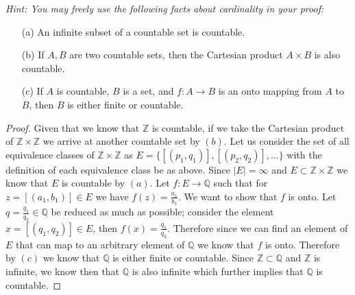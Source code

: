 \documentclass[11pt]{article}
\theoremstyle{definition}
\newcommand{\Z}{\mathbb{Z}}
\newcommand{\Q}{\mathbb{Q}}
\begin{document}
{\it Hint: You may freely use the following facts about cardinality in your proof: 
\begin{itemize}
	\item[(a)] An infinite subset of a countable set is countable.
	\item[(b)] If $A, B$ are two countable sets, then the Cartesian product $A \times B$ is also countable. 
	\item[(c)] If $A$ is countable, $B$ is a set, and $f : A \to B$ is an onto mapping from $A$ to $B$, then $B$ is either finite or countable. 
\end{itemize}

\begin{proof}
Given that we know that $\Z$ is countable, if we take the Cartesian product of $\Z \times \Z$ we arrive at another countable set by $(b)$. Let us consider the set of all equivalence classes of $\Z \times \Z$ as $E = \{[(p_1,q_1)], [(p_2,q_2)],...\}$ with the definition of each equivalence class be as above. Since $|E| = \infty$ and $E\subset \Z\times\Z$ we know that $E$ is countable by $(a)$. Let $f: E \rightarrow \Q$ such that for $z = [(a_1, b_1)]\in E$ we have $f(z) = \frac{a_1}{b_1}$. We want to show that $f$ is onto. Let $q = \frac{q_1}{q_2} \in \Q$ be reduced as much as possible; consider the element $x = [(q_1,q_2)]\in E$, then $f(x) = \frac{q_1}{q_2}$. Therefore since we can find an element of $E$ that can map to an arbitrary element of $\Q$ we know that $f$ is onto. Therefore by $(c)$ we know that $\Q$ is either finite or countable. Since $\Z \subset \Q$ and $\Z$ is infinite, we know then that $\Q$ is also infinite which further implies that $\Q$ is countable. 
\end{proof}

}
\end{document}
